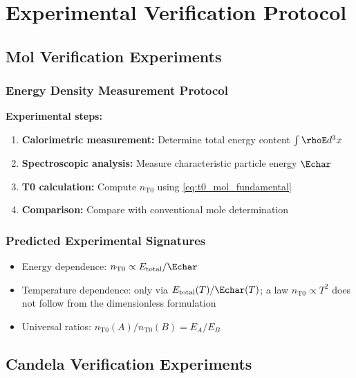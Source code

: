 \section{Experimental Verification Protocol}
\label{sec:experimental_verification}

\subsection{Mol Verification Experiments}
\label{subsec:mol_verification}

\subsubsection{Energy Density Measurement Protocol}
\label{subsubsec:mol_energy_protocol}

\textbf{Experimental steps:}
\begin{enumerate}
	\item \textbf{Calorimetric measurement:} Determine total energy content $\int \rhoE d^3x$
	\item \textbf{Spectroscopic analysis:} Measure characteristic particle energy $\Echar$
	\item \textbf{T0 calculation:} Compute $n_{\text{T0}}$ using \cref{eq:t0_mol_fundamental}
	\item \textbf{Comparison:} Compare with conventional mole determination
\end{enumerate}

\subsubsection{Predicted Experimental Signatures}
\label{subsubsec:mol_experimental_signatures}

\begin{itemize}
	\item Energy dependence: $n_{\text{T0}} \propto E_{\text{total}}/\Echar$
	\item Temperature dependence: only via $E_{\text{total}}(T)/\Echar(T)$; a law $n_{\text{T0}} \propto T^2$ does not follow from the dimensionless formulation
	\item Universal ratios: $n_{\text{T0}}(A)/n_{\text{T0}}(B) = E_A/E_B$
\end{itemize}

\subsection{Candela Verification Experiments}
\label{subsec:candela_verification}

